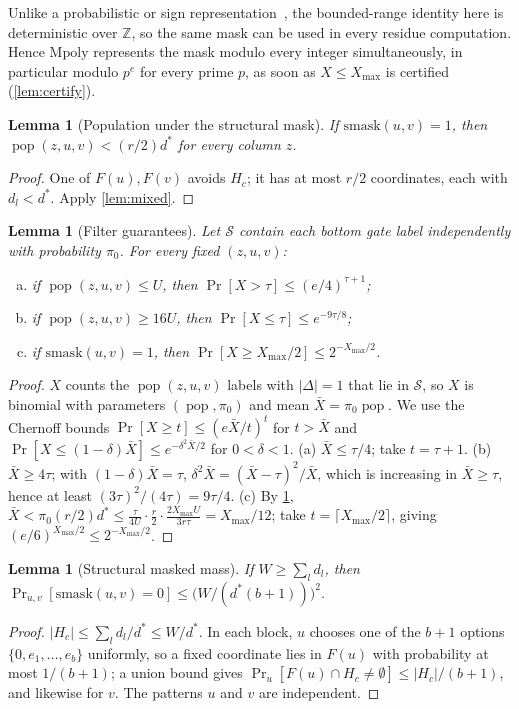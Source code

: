 \documentclass[11pt,letterpaper]{article}
\newtheorem{lemma}[theorem]{Lemma}
\theoremstyle{definition}
\theoremstyle{remark}
\newcommand{\Z}{\mathbb Z}
\newcommand{\pop}{\operatorname{pop}}
\newcommand{\smask}{\mathrm{smask}}
\newcommand{\Mpoly}{\mathrm{Mpoly}}
\newcommand{\cS}{\mathcal S}
\newcommand{\Xmax}{X_{\max}}
\begin{document}
Unlike a probabilistic or sign representation~\cite{ACW16}, the bounded-range identity here is deterministic over \(\Z\), so the same mask can be used in every residue computation. Hence \(\Mpoly\) represents the mask
modulo every integer simultaneously, in particular modulo \(p^e\) for
every prime \(p\), as soon as \(X\le\Xmax\) is certified
(\cref{lem:certify}).

\begin{lemma}[Population under the structural mask]\label{lem:smaskpop}
If \(\smask(u,v)=1\), then \(\pop(z,u,v)<(r/2)d^*\) for every column \(z\).
\end{lemma}
\begin{proof}
One of \(F(u),F(v)\) avoids \(H_c\); it has at most \(r/2\)
coordinates, each with \(d_l<d^*\). Apply \cref{lem:mixed}.
\end{proof}

\begin{lemma}[Filter guarantees]\label{lem:filter}
Let \(\cS\) contain each bottom gate label independently with
probability \(\pi_0\). For every fixed \((z,u,v)\):
\begin{enumerate}[(a)]
\item if \(\pop(z,u,v)\le U\), then \(\Pr[X>\tau]\le(e/4)^{\tau+1}\);
\item if \(\pop(z,u,v)\ge16U\), then \(\Pr[X\le\tau]\le e^{-9\tau/8}\);
\item if \(\smask(u,v)=1\), then \(\Pr[X\ge\Xmax/2]\le2^{-\Xmax/2}\).
\end{enumerate}
\end{lemma}
\begin{proof}
\(X\) counts the \(\pop(z,u,v)\) labels with \(|\Delta|=1\) that lie in
\(\cS\), so \(X\) is binomial with parameters \((\pop,\pi_0)\) and mean
\(\bar X=\pi_0\pop\). We use the Chernoff bounds
\(\Pr[X\ge t]\le(e\bar X/t)^t\) for \(t>\bar X\) and
\(\Pr[X\le(1-\delta)\bar X]\le e^{-\delta^2\bar X/2}\) for
\(0<\delta<1\).
(a) \(\bar X\le\tau/4\); take \(t=\tau+1\).
(b) \(\bar X\ge4\tau\); with \((1-\delta)\bar X=\tau\),
\(\delta^2\bar X=(\bar X-\tau)^2/\bar X\), which is increasing in
\(\bar X\ge\tau\), hence at least \((3\tau)^2/(4\tau)=9\tau/4\).
(c) By \cref{lem:smaskpop},
\(\bar X<\pi_0(r/2)d^*\le\frac{\tau}{4U}\cdot\frac r2\cdot\frac{2\Xmax U}{3r\tau}=\Xmax/12\);
take \(t=\lceil\Xmax/2\rceil\), giving \((e/6)^{\Xmax/2}\le2^{-\Xmax/2}\).
\end{proof}

\begin{lemma}[Structural masked mass]\label{lem:smaskmass}
If \(W\ge\sum_ld_l\), then
\(\Pr_{u,v}[\smask(u,v)=0]\le\bigl(W/(d^*(b+1))\bigr)^2\).
\end{lemma}
\begin{proof}
\(|H_c|\le\sum_ld_l/d^*\le W/d^*\). In each block, \(u\) chooses one of
the \(b+1\) options \(\{0,e_1,\dots,e_b\}\) uniformly, so a fixed
coordinate lies in \(F(u)\) with probability at most \(1/(b+1)\); a
union bound gives \(\Pr_u[F(u)\cap H_c\ne\emptyset]\le|H_c|/(b+1)\),
and likewise for \(v\). The patterns \(u\) and \(v\) are independent.
\end{proof}
\end{document}
